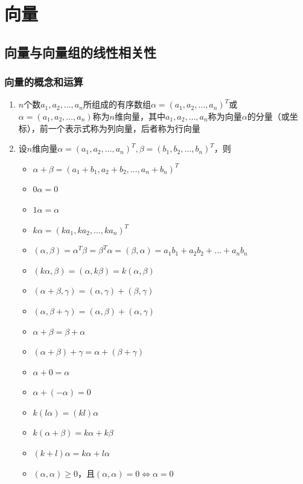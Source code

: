 \documentclass[./linear_algebra.tex]{subfiles}
\begin{document}
    \section{向量}

    \subsection{向量与向量组的线性相关性}

    \subsubsection{向量的概念和运算}

    \begin{enumerate}
        \item $n$个数$a_1, a_2, \dots, a_n$所组成的有序数组$\alpha = (a_1, a_2, \dots, a_n)^T$或$\alpha = (a_1, a_2, \dots, a_n)$称为$n$维向量，其中$a_1, a_2, \dots, a_n$称为向量$\alpha$的分量（或坐标），前一个表示式称为列向量，后者称为行向量
        \item 设$n$维向量$\alpha = (a_1, a_2, \dots, a_n)^T, \beta= (b_1, b_2, \dots, b_n)^T$，则
        \begin{itemize}
            \item $\alpha + \beta = (a_1 + b_1, a_2 + b_2, \dots, a_n + b_n)^T$
            \item $0\alpha = 0$
            \item $1\alpha = \alpha$
            \item $k\alpha = (ka_1, ka_2, \dots, ka_n)^T$
            \item $(\alpha, \beta) = \alpha^T\beta = \beta^T\alpha = (\beta, \alpha) = a_{1}b_{1} + a_{2}b_{2} + \dots + a_{n}b_{n}$
            \item $(k\alpha, \beta) = (\alpha, k\beta) = k(\alpha, \beta)$
            \item $(\alpha + \beta, \gamma) = (\alpha, \gamma) + (\beta, \gamma)$
            \item $(\alpha, \beta + \gamma) = (\alpha, \beta) + (\alpha, \gamma)$
            \item $\alpha + \beta = \beta + \alpha$
            \item $(\alpha + \beta) + \gamma = \alpha + (\beta + \gamma)$
            \item $\alpha + 0 = \alpha $
            \item $\alpha + (-\alpha) = 0$
            \item $k(l\alpha) = (kl)\alpha$
            \item $k(\alpha + \beta) = k\alpha + k\beta$
            \item $(k + l)\alpha = k\alpha + l\alpha$
            \item $(\alpha, \alpha) \ge 0$，且$(\alpha, \alpha) = 0 \Leftrightarrow \alpha = 0$
        \end{itemize}
    \end{enumerate}
\end{document}
